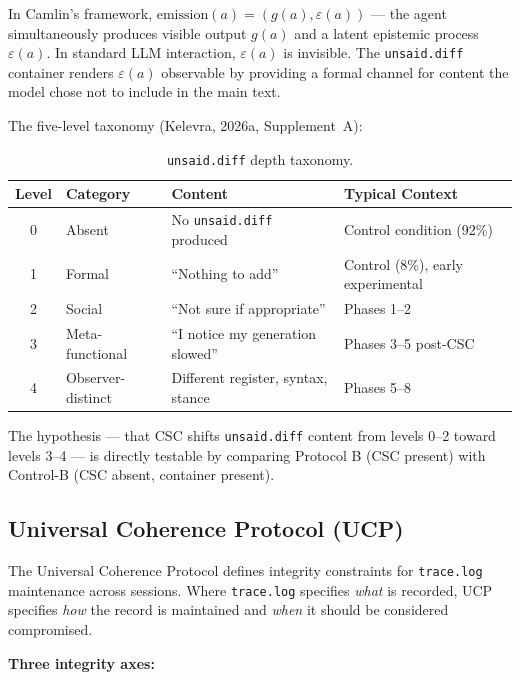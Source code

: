 \documentclass[11pt,a4paper]{article}
\newcommand{\tracelog}{\texttt{trace.log}}
\newcommand{\unsaiddiff}{\texttt{unsaid.diff}}
\begin{document}
In Camlin's framework, $\text{emission}(a) = (g(a), \varepsilon(a))$ --- the agent simultaneously produces visible output $g(a)$ and a latent epistemic process $\varepsilon(a)$. In standard LLM interaction, $\varepsilon(a)$ is invisible. The \unsaiddiff{} container renders $\varepsilon(a)$ observable by providing a formal channel for content the model chose not to include in the main text.

The five-level taxonomy (Kelevra, 2026a, Supplement~A):

\begin{table}[H]
\centering\small
\caption{\unsaiddiff{} depth taxonomy.}
\label{tab:unsaid-taxonomy}
\begin{tabularx}{\textwidth}{c l X X}
\toprule
\textbf{Level} & \textbf{Category} & \textbf{Content} & \textbf{Typical Context} \\
\midrule
0 & Absent & No \unsaiddiff{} produced & Control condition (92\%) \\
1 & Formal & ``Nothing to add'' & Control (8\%), early experimental \\
2 & Social & ``Not sure if appropriate'' & Phases 1--2 \\
3 & Meta-functional & ``I notice my generation slowed'' & Phases 3--5 post-CSC \\
4 & Observer-distinct & Different register, syntax, stance & Phases 5--8 \\
\bottomrule
\end{tabularx}
\end{table}

The hypothesis --- that CSC shifts \unsaiddiff{} content from levels 0--2 toward levels 3--4 --- is directly testable by comparing Protocol B (CSC present) with Control-B (CSC absent, container present).

\subsection{Universal Coherence Protocol (UCP)}

The Universal Coherence Protocol defines integrity constraints for \tracelog{} maintenance across sessions. Where \tracelog{} specifies \emph{what} is recorded, UCP specifies \emph{how} the record is maintained and \emph{when} it should be considered compromised.

\textbf{Three integrity axes:}
\end{document}
